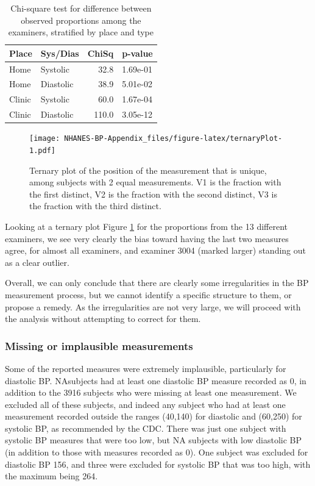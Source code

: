 \documentclass[
]{article}
\begin{document}
\begin{table}[!h]

\caption{\label{tab:ternaryChi2}Chi-square test for difference between observed proportions among the examiners, stratified by place and type}
\centering
\begin{tabular}[t]{llrl}
\toprule
Place & Sys/Dias & ChiSq & p-value\\
\midrule
Home & Systolic & 32.8 & 1.69e-01\\
Home & Diastolic & 38.9 & 5.01e-02\\
Clinic & Systolic & 60.0 & 1.67e-04\\
Clinic & Diastolic & 110.0 & 3.05e-12\\
\bottomrule
\end{tabular}
\end{table}

\begin{figure}
\centering
\texttt{[image: NHANES-BP-Appendix\_files/figure-latex/ternaryPlot-1.pdf]}
\caption{\label{fig:ternaryPlot}Ternary plot of the position of the measurement that is unique, among subjects with 2 equal measurements. V1 is the fraction with the first distinct, V2 is the fraction with the second distinct, V3 is the fraction with the third distinct.}
\end{figure}

Looking at a ternary plot Figure \ref{fig:ternaryPlot} for the proportions from the 13 different examiners, we see very clearly the bias toward having the last two measures agree, for almost all examiners, and examiner 3004 (marked larger) standing out as a clear outlier.

Overall, we can only conclude that there are clearly some irregularities in the BP measurement process, but we cannot identify a specific structure to them, or propose a remedy.
As the irregularities are not very large, we will proceed with the analysis without attempting to correct for them.

\hypertarget{sec:BPrange}{%
\subsubsection{Missing or implausible measurements}\label{sec:BPrange}}

Some of the reported measures were extremely implausible, particularly for diastolic BP. NAsubjects had at least one diastolic BP measure recorded as 0, in addition to the 3916 subjects who were missing at least one measurement. We excluded all of these subjects, and indeed any subject who had at least one measurement recorded outside the ranges (40,140) for diastolic and (60,250) for systolic BP, as recommended by the CDC.
There was just one subject with systolic BP measures that were too low, but NA subjects with low diastolic BP (in addition to those with measures recorded as 0).
One subject was excluded for diastolic BP 156, and three were excluded for systolic BP that was too high, with the maximum being 264.
\end{document}
